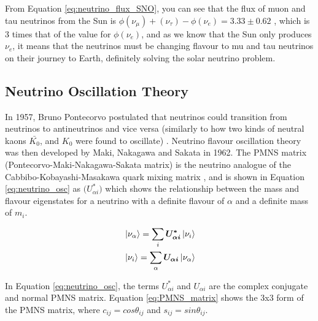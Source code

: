 From Equation \ref{eq:neutrino_flux_SNO}, you can see that the flux of muon and tau neutrinos from the Sun is $\phi(\nu_{\mu}) + (\nu_{\tau}) - \phi(\nu_{e}) = 3.33 \pm 0.62$ , which is 3 times that of the value for $\phi(\nu_{e})$, and as we know that the Sun only produces $\nu_{e}$, it means that the neutrinos must be changing flavour to mu and tau neutrinos on their journey to Earth, definitely solving the solar neutrino problem. 


\subsection{Neutrino Oscillation Theory}
In 1957, Bruno Pontecorvo postulated that neutrinos could transition from neutrinos to antineutrinos and vice versa (similarly to how two kinds of neutral kaons $\bar{K_{0}}$, and $K_{0}$ were found to oscillate) \cite{Pontecorvo:1957cp}. Neutrino flavour oscillation theory was then developed by Maki, Nakagawa and Sakata in 1962. The PMNS matrix (Pontecorvo-Maki-Nakagawa-Sakata matrix) is the neutrino analogue of the Cabbibo-Kobayashi-Masakawa quark mixing matrix \cite{maki_pmns}, and is shown in Equation \ref{eq:neutrino_osc} as $\boldsymbol(U_{\alpha i}^{*})$ which shows the relationship between the mass and flavour eigenstates for a neutrino with a definite flavour of $\alpha$ and a definite mass of $m_{i}$.


\begin{align}
&\left|\nu_{\alpha}\right\rangle=\sum_{i} \boldsymbol{U_{\alpha i}^{*}}\left|\nu_{i}\right\rangle \label{eq:neutrino_osc}  \\
&\left|\nu_{i}\right\rangle=\sum_{\alpha} \boldsymbol{U_{\alpha i}}\left|\nu_{\alpha}\right\rangle \notag
\end{align}


In Equation \ref{eq:neutrino_osc}, the terms $U_{\alpha i}^{*}$ and $U_{\alpha i}$ are the complex conjugate and normal PMNS matrix. Equation \ref{eq:PMNS_matrix} shows the 3x3 form of the PMNS matrix, where $c_{ij} = cos {\theta_{ij}}$ and $s_{ij} = sin {\theta_{ij}}$.

